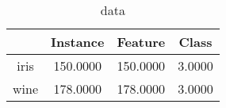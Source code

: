 \begin{table}
\centering
\begin{tabular}{cccc}
\toprule
 & Instance & Feature & Class \\
\midrule
iris & 150.0000 & 150.0000 & 3.0000 \\
wine & 178.0000 & 178.0000 & 3.0000 \\
\bottomrule
\end{tabular}
\caption{data}
\label{table:data}
\end{table}

